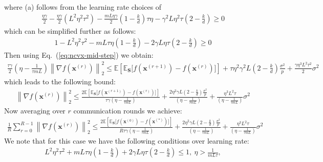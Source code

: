 where (a) follows from the learning rate choices of 
\begin{align}
    \frac{\eta\gamma}{2}-\frac{\eta\gamma}{2}\left(L^2\eta^2\tau^2\right)-\frac{mL\eta\gamma}{2}\left(1-\frac{k}{d}\right)\tau\eta-\gamma^2 L\eta^2\tau\left(2-\frac{k}{d}\right)\geq 0
\end{align}
which can be simplified further as follows:
\begin{align}
    1-L^2\eta^2\tau^2-mL\tau\eta\left(1-\frac{k}{d}\right)-2\gamma L\eta\tau\left(2-\frac{k}{d}\right)\geq 0
\end{align}
Then using Eq.~(\ref{eq:ncvx-mid-step}) we obtain:
\begin{align}
  \frac{\tau\gamma}{2} \left({\eta}-\frac{1}{\tau mL}\right)\left\|\nabla f({\boldsymbol{x}}^{(r)})\right\|_2^2\leq \mathbb{E}\left[\mathbb{E}_\mathbf{S}\Big[f({\boldsymbol{x}}^{(r+1)})-f({\boldsymbol{x}}^{(r)})\Big]\right]+\tau\eta^2\gamma^2 L\left(2-\frac{k}{d}\right)\frac{\sigma^2}{p}+\frac{\gamma\eta^3L^2\tau^2}{2}\sigma^2
\end{align}
which leads to the following bound:
\begin{align}
     \left\|\nabla f({\boldsymbol{x}}^{(r)})\right\|_2^2\leq \frac{2 \mathbb{E}\left[\mathbb{E}_\mathbf{S}\Big[f({\boldsymbol{x}}^{(r+1)})-f({\boldsymbol{x}}^{(r)})\Big]\right]}{\tau \gamma \left({\eta}-\frac{1}{\tau mL}\right)}+\frac{2\eta^2\gamma L\left(2-\frac{k}{d}\right)\frac{\sigma^2}{p}}{ \left({\eta}-\frac{1}{\tau mL}\right)}+\frac{\eta^3L^2\tau}{\left({\eta}-\frac{1}{\tau mL}\right)}\sigma^2 
\end{align}
Now averaging over $r$ communication rounds we achieve:
\begin{align}
    \frac{1}{R}\sum_{r=0}^{R-1}\left\|\nabla f({\boldsymbol{x}}^{(r)})\right\|_2^2\leq \frac{2 \mathbb{E}\left[\mathbb{E}_\mathbf{S}\Big[f({\boldsymbol{x}}^{(0)})-f({\boldsymbol{x}}^{(*)})\Big]\right]}{R\tau \gamma \left({\eta}-\frac{1}{\tau mL}\right)}+\frac{2\eta^2\gamma L\left(2-\frac{k}{d}\right)\frac{\sigma^2}{p}}{ \left({\eta}-\frac{1}{\tau mL}\right)}+\frac{\eta^3L^2\tau}{\left({\eta}-\frac{1}{\tau mL}\right)}\sigma^2 
\end{align}
We note that for this case we have the following conditions over learning rate:
\begin{align}
    L^2\eta^2\tau^2+mL\tau\eta\left(1-\frac{k}{d}\right)+2\gamma L\eta\tau\left(2-\frac{k}{d}\right)\leq 1,\:\eta> \frac{1}{mL\tau},
\end{align}

